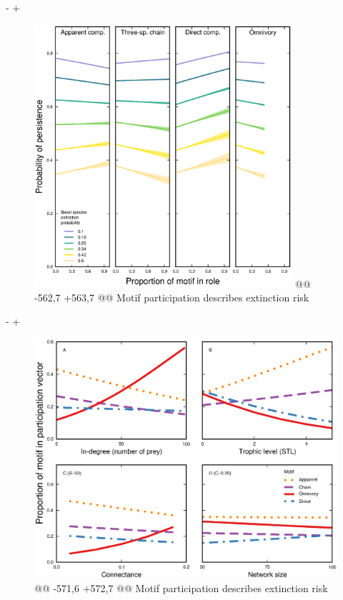 -    
+        %
         \begin{figure}[hb!]
         \centering
         \includegraphics[width=0.85\textwidth]{figures/persistence_motif_participation.eps}
@@ -562,7 +563,7 @@ Motif participation describes extinction risk
     \label{fig:prop_lmer_all}
     \end{figure}
         
-
+        %
     \begin{figure}[hb!]
         \centering
         \includegraphics[width=\textwidth]{figures/roles_vs_TL.eps}
@@ -571,6 +572,7 @@ Motif participation describes extinction risk
         \label{fig:motifs_vs_TL_and_deg}
     \end{figure}        
 
